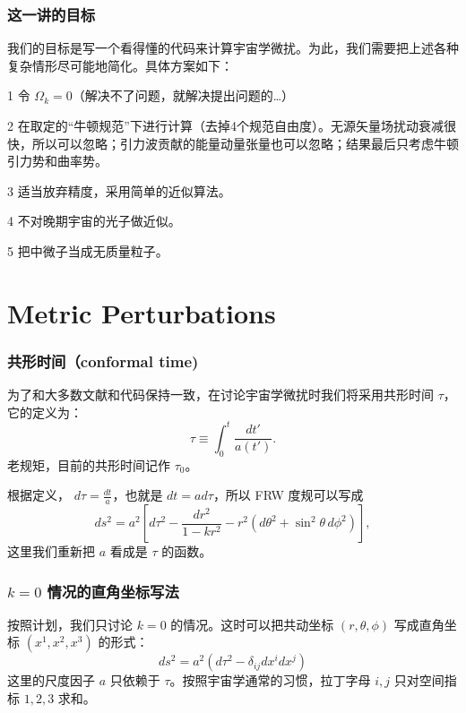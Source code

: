 \documentclass[CJK,13pt]{beamer}
\begin{document}
  \begin{frame}
    \frametitle{这一讲的目标}
    我们的目标是写一个看得懂的代码来计算宇宙学微扰。为此，我们需要把上述各种复杂情形尽可能地简化。具体方案如下：

    \bitem
  \item[1]{令 $\Omega_k=0$（解决不了问题，就解决提出问题的…）}
  \item[2]{在取定的“牛顿规范”下进行计算（去掉4个规范自由度）。无源矢量场扰动衰减很快，所以可以忽略；引力波贡献的能量动量张量也可以忽略；结果最后只考虑牛顿引力势和曲率势。}
  \item[3]{适当放弃精度，采用简单的近似算法。}
  \item[4]{不对晚期宇宙的光子做近似。}
  \item[5]{把中微子当成无质量粒子。}
    \eitem


    
  \end{frame}

  \section{Metric Perturbations}
  
  \begin{frame}
      \frametitle{共形时间（conformal time) }
        为了和大多数文献和代码保持一致，在讨论宇宙学微扰时我们将采用共形时间 $\tau$，它的定义为：
        $$ \tau \equiv \int_0^t \frac{dt'}{a(t')}.$$
        老规矩，目前的共形时间记作 $\tau_0$。


        \skiplines

        根据定义， $d\tau = \frac{dt}{a}$，也就是 $dt = a d\tau$，所以 FRW 度规可以写成
        $$ ds^2 = a^2\left[d\tau^2 - \frac{dr^2}{1-kr^2} - r^2\left(d\theta^2+\sin^2\theta\,d\phi^2\right)\right],$$
        这里我们重新把 $a$ 看成是 $\tau$ 的函数。

  \end{frame}



    \begin{frame}
      \frametitle{$k=0$ 情况的直角坐标写法}
      按照计划，我们只讨论 $k=0$ 的情况。这时可以把共动坐标 $(r,\theta,\phi)$ 写成直角坐标 $ (x^1, x^2, x^3)$ 的形式：
      $$ ds^2 = a^2\left(d\tau^2-\delta_{ij}dx^i dx^j\right)$$
      这里的尺度因子 $a$ 只依赖于 $\tau$。按照宇宙学通常的习惯，拉丁字母 $i, j$ 只对空间指标 $1,2,3$ 求和。
  \end{frame}
\end{document}
